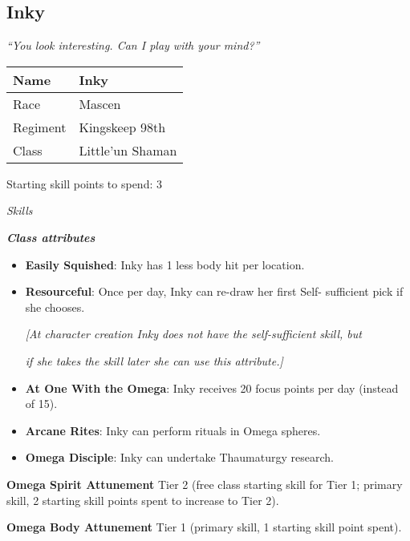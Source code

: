 \documentclass{scrbook}
\begin{document}
\subsection{Inky}

\textit{``You look interesting. Can I play with your mind?''}

\begin{table}
\begin{tabular}{|l|l|} \hline 
Name & Inky \\
 \hline Race & Mascen \\
 \hline Regiment & Kingskeep 98th \\
 \hline Class & Little'un Shaman \\
 \hline \end{tabular}

\end{table}

Starting skill points to spend: 3

\textit{Skills}

\textbf{\textit{Class attributes}}

\begin{itemize}
\item \textbf{Easily Squished}: Inky has 1 less body hit per location.

\item \textbf{Resourceful}: Once per day, Inky can re-draw her first Self- sufficient pick if she chooses.

\textit{{[}At character creation Inky does not have the self-sufficient skill, but}

\textit{if she takes the skill later she can use this attribute.{]}}

\item \textbf{At One With the Omega}: Inky receives 20 focus points per day (instead of 15).

\item \textbf{Arcane Rites}: Inky can perform rituals in Omega spheres.

\item \textbf{Omega Disciple}: Inky can undertake Thaumaturgy research.

\end{itemize}
\textbf{Omega Spirit Attunement} Tier 2 (free class starting skill for Tier 1; primary skill, 2 starting skill points spent to increase to Tier 2).

\textbf{Omega Body Attunement} Tier 1 (primary skill, 1 starting skill point spent).
\end{document}

